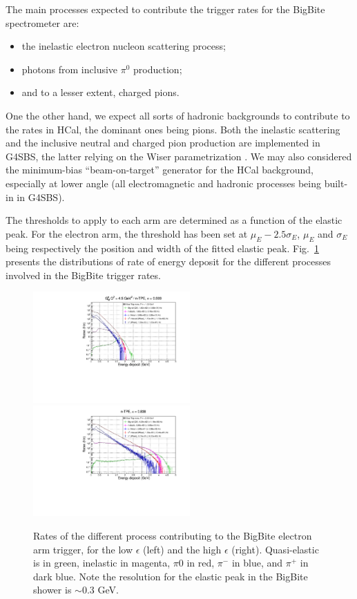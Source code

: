 The main processes expected to contribute the trigger rates for the BigBite spectrometer are:
%
\begin{itemize}
\item{the inelastic electron nucleon scattering process;}
\item{photons from inclusive $\pi^0$ production;}
\item{and to a lesser extent, charged pions.}
\end{itemize}
%
One the other hand, we expect all sorts of hadronic backgrounds to contribute to the rates in HCal, the dominant ones being pions.
Both the inelastic scattering and the inclusive neutral and charged pion production are implemented in G4SBS, the latter relying on the Wiser parametrization \cite{wiser}.
We may also considered the minimum-bias ``beam-on-target'' generator for the HCal background, especially at lower angle (all electromagnetic and hadronic processes being built-in in G4SBS).

The thresholds to apply to each arm are determined as a function of the elastic peak.
For the electron arm, the threshold has been set at $\mu_E - 2.5 \sigma_E$,  $\mu_E$ and $\sigma_E$ being respectively the position and width of the fitted elastic peak. 
Fig.~\ref{fig:BBRates} presents the distributions of rate of energy deposit for the different processes involved in the BigBite trigger rates. 
%
\begin{figure}[!h]
  \begin{center}
    \includegraphics[width=6cm]{Plots/BBECalRates_gen-tpe_le.pdf}
    \includegraphics[width=6cm]{Plots/BBECalRates_gen-tpe_he.pdf}
    \caption{Rates of the different process contributing to the BigBite electron arm trigger, for the low $\epsilon$ (left) and the high $\epsilon$ (right). Quasi-elastic is in green, inelastic in magenta, $\pi0$ in red, $\pi^-$ in blue, and $\pi^+$ in dark blue. Note the resolution for the elastic peak in the BigBite shower is $\sim0.3$ GeV.}
    \label{fig:BBRates}
  \end{center}
\end{figure}
%

